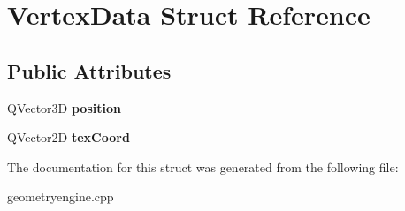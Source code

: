 \hypertarget{structVertexData}{}\section{Vertex\+Data Struct Reference}
\label{structVertexData}
\subsection*{Public Attributes}
\begin{DoxyCompactItemize}
\item 
\mbox{\label{structVertexData_aa95ed753a0e53362d2f60e8f219633e9}} 
Q\+Vector3D {\bfseries position}
\item 
\mbox{\label{structVertexData_acc75a04430d8020a89db36e4325accf6}} 
Q\+Vector2D {\bfseries tex\+Coord}
\end{DoxyCompactItemize}


The documentation for this struct was generated from the following file\+:\begin{DoxyCompactItemize}
\item 
geometryengine.\+cpp\end{DoxyCompactItemize}
